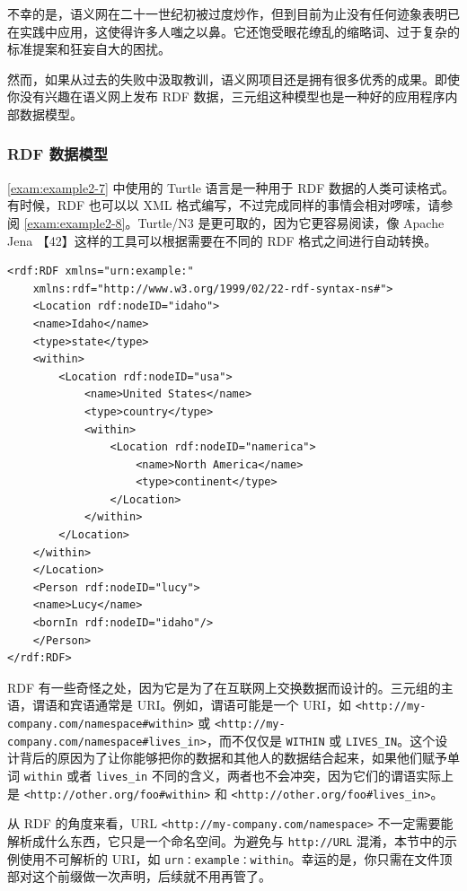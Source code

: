 不幸的是，语义网在二十一世纪初被过度炒作，但到目前为止没有任何迹象表明已在实践中应用，这使得许多人嗤之以鼻。它还饱受眼花缭乱的缩略词、过于复杂的标准提案和狂妄自大的困扰。

然而，如果从过去的失败中汲取教训，语义网项目还是拥有很多优秀的成果。即使你没有兴趣在语义网上发布 RDF 数据，三元组这种模型也是一种好的应用程序内部数据模型。

\subsubsection{RDF 数据模型}

\autoref{exam:example2-7} 中使用的 Turtle 语言是一种用于 RDF 数据的人类可读格式。有时候，RDF 也可以以 XML 格式编写，不过完成同样的事情会相对啰嗦，请参阅 \autoref{exam:example2-8}。Turtle/N3 是更可取的，因为它更容易阅读，像 Apache Jena 【42】这样的工具可以根据需要在不同的 RDF 格式之间进行自动转换。

\label{exam:example2-8}
\begin{lstlisting}[caption={用 RDF/XML 语法表示例 2-7 的数据}]
<rdf:RDF xmlns="urn:example:"
    xmlns:rdf="http://www.w3.org/1999/02/22-rdf-syntax-ns#">
    <Location rdf:nodeID="idaho">
    <name>Idaho</name>
    <type>state</type>
    <within>
        <Location rdf:nodeID="usa">
            <name>United States</name>
            <type>country</type>
            <within>
                <Location rdf:nodeID="namerica">
                    <name>North America</name>
                    <type>continent</type>
                </Location>
            </within>
        </Location>
    </within>
    </Location>
    <Person rdf:nodeID="lucy">
    <name>Lucy</name>
    <bornIn rdf:nodeID="idaho"/>
    </Person>
</rdf:RDF>
\end{lstlisting}

RDF 有一些奇怪之处，因为它是为了在互联网上交换数据而设计的。三元组的主语，谓语和宾语通常是 URI。例如，谓语可能是一个 URI，如 \texttt{<http://my-company.com/namespace\#within>} 或 \texttt{<http://my-company.com/namespace\#lives\_in>}，而不仅仅是 \texttt{WITHIN} 或 \texttt{LIVES\_IN}。这个设计背后的原因为了让你能够把你的数据和其他人的数据结合起来，如果他们赋予单词 \texttt{within} 或者 \texttt{lives\_in} 不同的含义，两者也不会冲突，因为它们的谓语实际上是 \texttt{<http://other.org/foo\#within>} 和 \texttt{<http://other.org/foo\#lives\_in>}。

从 RDF 的角度来看，URL \texttt{<http://my-company.com/namespace>} 不一定需要能解析成什么东西，它只是一个命名空间。为避免与 \texttt{http://URL} 混淆，本节中的示例使用不可解析的 URI，如 \texttt{urn：example：within}。幸运的是，你只需在文件顶部对这个前缀做一次声明，后续就不用再管了。

